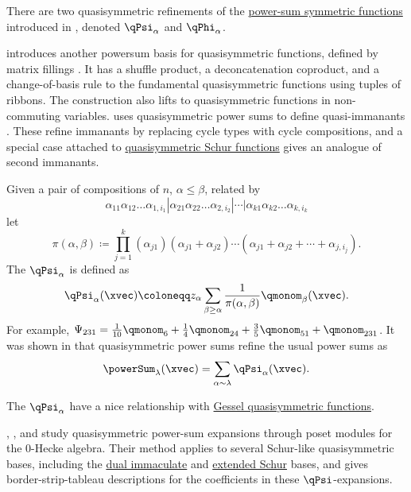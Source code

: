There are two quasisymmetric refinements of the
\hyperref[powerSum]{power-sum symmetric functions} introduced in
\cite{BallantineDaughertyHicksMason2020}, denoted $\qPsi_\alpha$ and
$\qPhi_\alpha$.

 introduces another powersum basis for
quasisymmetric functions, defined by matrix fillings
\cite{Lazzeroni2023}.  It has a shuffle product, a deconcatenation coproduct,
and a change-of-basis rule to the fundamental quasisymmetric functions using
tuples of ribbons.  The construction also lifts to quasisymmetric functions in
non-commuting variables.
 uses quasisymmetric power sums to define
quasi-immanants \cite{Campbell2025x}.  These refine immanants by replacing
cycle types with cycle compositions, and a special case attached to
\hyperref[qSchur]{quasisymmetric Schur functions} gives an analogue of
second immanants.


Given a pair of compositions of $n$, $\alpha \leq \beta$, related by
\begin{equation*}
 \alpha_{11} \alpha_{12} \dotsc \alpha_{1,i_1}|
 \alpha_{21} \alpha_{22} \dotsc \alpha_{2,i_2} | \dotsb |
 \alpha_{k1} \alpha_{k2} \dotsc \alpha_{k,i_k}
\end{equation*}
let 
\begin{equation*}
\pi(\alpha,\beta)
\coloneqq
\prod_{j=1}^k
(\alpha_{j1})(\alpha_{j1}+\alpha_{j2})\dotsb
(\alpha_{j1}+\alpha_{j2}+\dotsb +\alpha_{j,i_j}).
\end{equation*}
The \label{quasisymmetricPowerSumPsi}
$\qPsi_\alpha$ is defined as
\begin{equation*}
\qPsi_\alpha(\xvec)
\coloneqq
z_\alpha
\sum_{\beta \geq \alpha}
\frac{1}{\pi(\alpha,\beta)} \qmonom_\beta(\xvec).
\end{equation*}
For example,
$\Psi_{231} =
\frac{1}{10}\qmonom_6 +
\frac{1}{4}\qmonom_{24}+
\frac{3}{5}\qmonom_{51}+\qmonom_{231}$.
It was shown in \cite{BallantineDaughertyHicksMason2020}
that quasisymmetric power sums refine the usual power sums as
\[
\powerSum_{\lambda}(\xvec) = \sum_{\alpha \sim \lambda}\qPsi_{\alpha}(\xvec).
\]


The $\qPsi_\alpha$ have a nice relationship with \hyperref[gesselQuasiPowerSum]{Gessel quasisymmetric functions}.

, , and 
\cite{ChoiKimOh2024} study quasisymmetric power-sum expansions through
poset modules for the $0$-Hecke algebra.  Their method applies to several
Schur-like quasisymmetric bases, including the \hyperref[diSchur]{dual
immaculate} and \hyperref[extSchur]{extended Schur} bases, and gives
border-strip-tableau descriptions for the coefficients in these
$\qPsi$-expansions.



